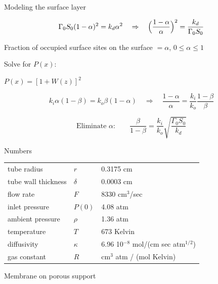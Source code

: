\documentclass[12pt,a4paper]{beamer}
\begin{document}
\begin{CJK*}{UTF8}{gkai}
\begin{frame}{Modeling the surface layer}

\[
  \Gamma_0 S_0 (1-\alpha)^2 = k_d \alpha^2
  \quad \Rightarrow \quad
  \Bigl(\frac{1-\alpha}{\alpha}\Bigr)^2 = \frac{k_d}{\Gamma_0 S_0}
\]

Fraction of occupied surface sites on the surface $ = \alpha$, \quad
$0 \le \alpha \le 1$

\medskip

\begin{center}
  Solve for $P(x)$:\qquad
  \begin{onlinebox}{45mm} 
  	$\displaystyle P(x) = [ 1 + W(z)]^2$
  \end{onlinebox}
\end{center}

\medskip

\begin{displaybox}{90mm}
\[
  k_i \alpha (1-\beta) = k_o \beta (1-\alpha)
  \quad \Rightarrow \quad
  \frac{1-\alpha}{\alpha} = \frac{k_i}{k_o} \frac{1-\beta}{\beta}
\]

\[
  \text{Eliminate $\alpha$:} \qquad
  \frac{\beta}{1-\beta} = \frac{k_i}{k_o}
  \sqrt{\frac{\Gamma_0S_0}{k_d}} 
\]
\end{displaybox}
\end{frame}

\begin{frame}{Numbers}


\renewcommand{\arraystretch}{1.7}
\begin{tabular}{lll}
  tube radius & $r$ & 0.3175 cm \\
  tube wall thickness & $\delta$ & 0.0003 cm \\
  flow rate & $F$ & 8330 cm$^3$/sec \\
  inlet pressure & $P(0)$ & 4.08 atm \\
  ambient pressure & $\rho$ & 1.36 atm \\
  temperature & $T$ & 673 Kelvin \\
  diffusivity & $\kappa$ & 6.96 10$^{-8}$ mol/(cm sec atm$^{1/2}$) \\
  gas constant & $R$ & cm$^3$ atm / (mol Kelvin)
\end{tabular}

\end{frame}

\begin{frame}{Membrane on porous support}


\end{frame}
\end{CJK*}
\end{document}
